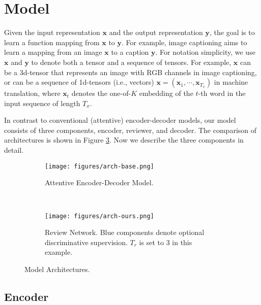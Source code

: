 \documentclass{article}
\begin{document}
\section{Model}%
Given the input representation $\mathbf{x}$ and the output representation $\mathbf{y}$, the goal is to learn a function mapping from $\mathbf{x}$ to $\mathbf{y}$.  For example, image captioning aims to learn a mapping from an image $\mathbf{x}$ to a caption $\mathbf{y}$. For notation simplicity, we use $\mathbf{x}$ and $\mathbf{y}$ to denote both a tensor and a sequence of tensors. For example, $\mathbf{x}$ can be a 3d-tensor that represents an image with RGB channels in image captioning, or can be a sequence of 1d-tensors (i.e., vectors) $\mathbf{x} = (\mathbf{x}_1, \cdots, \mathbf{x}_{T_x})$ in machine translation, where $\mathbf{x}_t$ denotes the one-of-$K$ embedding of the $t$-th word in the input sequence of length $T_x$.

In contrast to conventional (attentive) encoder-decoder models, our model consists of three components, encoder, reviewer, and decoder. The comparison of architectures is shown in Figure \ref{fig:arch}. Now we describe the three components in detail.

\begin{figure}
    \centering
    \begin{subfigure}[t]{0.28\textwidth}
        \texttt{[image: figures/arch-base.png]}
        \caption{\small Attentive Encoder-Decoder Model.}
        \label{fig:arch-base}
    \end{subfigure}
    ~~~~~~~
    \begin{subfigure}[t]{0.6\textwidth}
        \texttt{[image: figures/arch-ours.png]}
        \caption{\small Review Network. Blue components denote optional discriminative supervision. $T_r$ is set to $3$ in this example.}
        \label{fig:arch-ours}
    \end{subfigure}
    \caption{\small Model Architectures.}\label{fig:arch}
\end{figure}\subsection{Encoder}\label{sec:cnn}
\end{document}

